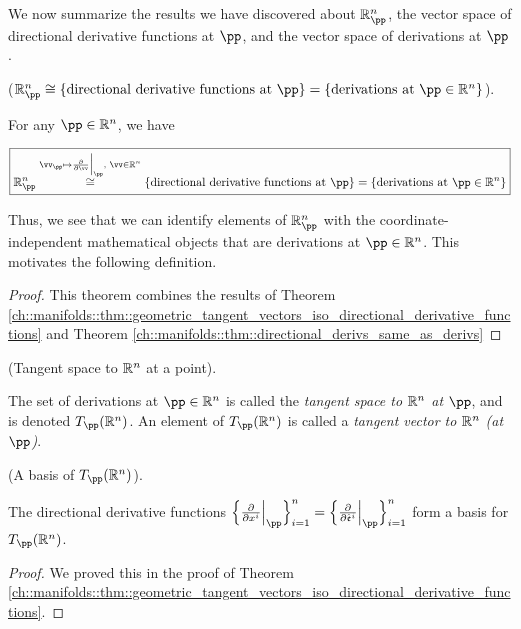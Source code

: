 We now summarize the results we have discovered about $\R^n_\pp$, the vector space of directional derivative functions at $\pp$, and the vector space of derivations at $\pp$.

\begin{theorem}
    ($\R^n_\pp \cong \{ \text{directional derivative functions at $\pp$} \} = \{ \text{derivations at $\pp \in \R^n$} \}$).

    For any $\pp \in \R^n$, we have
    
    \begin{align*}
        \boxed
        {
            \R^n_\pp \overset{\vv_\pp \mapsto \frac{\pd}{\pd \vv}\Big|_\pp, \spc \vv \in \R^n}{\cong} \{ \text{directional derivative functions at $\pp$} \} = \{ \text{derivations at $\pp \in \R^n$} \}
        }
    \end{align*}
\end{theorem}

Thus, we see that we can identify elements of $\R^n_\pp$ with the coordinate-independent mathematical objects that are derivations at $\pp \in \R^n$. This motivates the following definition.

\begin{proof}
    This theorem combines the results of Theorem \ref{ch::manifolds::thm::geometric_tangent_vectors_iso_directional_derivative_functions} and Theorem \ref{ch::manifolds::thm::directional_derivs_same_as_derivs}
\end{proof}

\begin{defn}
    (Tangent space to $\mathbb{R}^n$ at a point).
    
    The set of derivations at $\pp \in \R^n$ is called the \textit{tangent space to $\mathbb{R}^n$ at $\pp$}, and is denoted $T_\pp(\R^n)$. An element of $T_\pp(\R^n)$ is called a \textit{tangent vector to $\mathbb{R}^n$ (at $\pp$)}.
\end{defn}

\begin{theorem}
\label{ch::manifolds::thm::basis_of_TpRn}
     (A basis of $T_\pp(\R^n)$).
    
    The directional derivative functions $\Big\{ \frac{\pd}{\pd x^i}\Big|_\pp \Big\}_{i = 1}^n = \Big\{ \frac{\pd}{\pd \see^i}\Big|_\pp \Big\}_{i = 1}^n$ form a basis for $T_\pp(\R^n)$.
\end{theorem}
    
\begin{proof}
     We proved this in the proof of Theorem \ref{ch::manifolds::thm::geometric_tangent_vectors_iso_directional_derivative_functions}.
\end{proof}

